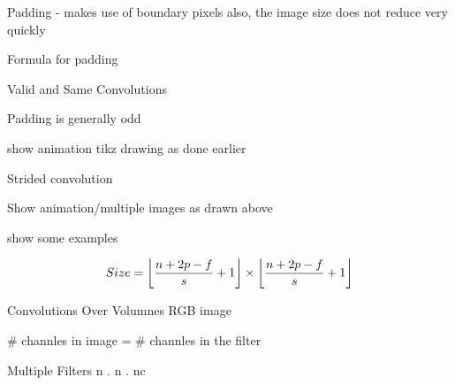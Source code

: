 \documentclass{beamer}
\DeclarePairedDelimiter\floor{\lfloor}{\rfloor}
\begin{document}
\begin{frame}
Padding -  makes use of boundary pixels also, the image size does not reduce very quickly

Formula for padding

Valid and Same Convolutions

Padding is generally odd

show animation tikz drawing as done earlier
\end{frame}


\begin{frame}
Strided convolution

Show animation/multiple images as drawn above

show some examples 

\begin{align*}
Size = \floor*{\frac{n+2p-f}{s}+1} \times \floor*{\frac{n+2p-f}{s}+1}
\end{align*}
\end{frame}


\begin{frame}{Convolutions Over Volumnes}
RGB image

\# channles in image = \# channles in the filter
\end{frame}

\begin{frame}{Multiple Filters}
n . n . nc
\end{frame}
\end{document}
